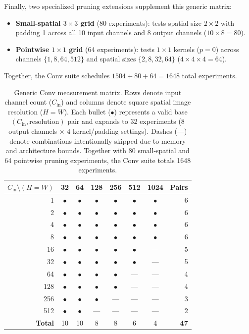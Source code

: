 Finally, two specialized pruning extensions supplement this generic matrix:
\begin{itemize}
    \item \textbf{Small-spatial $3\times 3$ grid} (80 experiments): tests spatial size $2 \times 2$ with padding 1 across all 10 input channels and 8 output channels ($10 \times 8 = 80$).
    \item \textbf{Pointwise $1\times 1$ grid} (64 experiments): tests $1\times 1$ kernels ($p=0$) across channels $\{1, 8, 64, 512\}$ and spatial sizes $\{2, 8, 32, 64\}$ ($4 \times 4 \times 4 = 64$).
\end{itemize}
Together, the Conv suite schedules $1504 + 80 + 64 = 1648$ total experiments.

\begin{table}
    \centering
    \begin{tabular}{r|*{6}{c}|r}
        \hline
        \textbf{$C_{\text{in}} \setminus (H{=}W)$} & \textbf{32} & \textbf{64} & \textbf{128} &
        \textbf{256} & \textbf{512} & \textbf{1024} & \textbf{Pairs} \\
        \hline
        1   & $\bullet$ & $\bullet$ & $\bullet$ & $\bullet$ & $\bullet$ & $\bullet$ & 6 \\
        2   & $\bullet$ & $\bullet$ & $\bullet$ & $\bullet$ & $\bullet$ & $\bullet$ & 6 \\
        4   & $\bullet$ & $\bullet$ & $\bullet$ & $\bullet$ & $\bullet$ & $\bullet$ & 6 \\
        8   & $\bullet$ & $\bullet$ & $\bullet$ & $\bullet$ & $\bullet$ & $\bullet$ & 6 \\
        16  & $\bullet$ & $\bullet$ & $\bullet$ & $\bullet$ & $\bullet$ & --- & 5 \\
        32  & $\bullet$ & $\bullet$ & $\bullet$ & $\bullet$ & $\bullet$ & --- & 5 \\
        64  & $\bullet$ & $\bullet$ & $\bullet$ & $\bullet$ & --- & --- & 4 \\
        128 & $\bullet$ & $\bullet$ & $\bullet$ & $\bullet$ & --- & --- & 4 \\
        256 & $\bullet$ & $\bullet$ & $\bullet$ & --- & --- & --- & 3 \\
        512 & $\bullet$ & $\bullet$ & --- & --- & --- & --- & 2 \\
        \hline
        \textbf{Total} & 10 & 10 & 8 & 8 & 6 & 4 & \textbf{47} \\
        \hline
    \end{tabular}
    \caption{Generic Conv measurement matrix. Rows denote input channel count ($C_{\text{in}}$) and columns denote square spatial image resolution ($H = W$). Each bullet ($\bullet$) represents a valid base $(C_{\text{in}}, \text{resolution})$ pair and expands to 32 experiments (8 output channels $\times$ 4 kernel/padding settings). Dashes (---) denote combinations intentionally skipped due to memory and architecture bounds. Together with 80 small-spatial and 64 pointwise pruning experiments, the Conv suite totals 1648 experiments.}
    \label{tab:conv-matrix}
\end{table}

